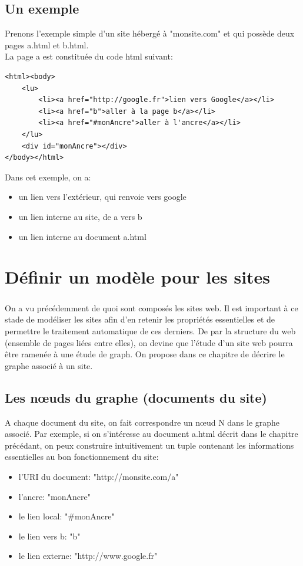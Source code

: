 \documentclass[a4paper]{report}
\begin{document}
\section*{Un exemple\\}
Prenons l'exemple simple d'un site hébergé à "monsite.com" et qui possède deux pages a.html et b.html.\\
La page a est constituée du code html suivant:\\
\begin{verbatim}
<html><body>
	<lu>
		<li><a href="http://google.fr">lien vers Google</a></li>
		<li><a href="b">aller à la page b</a></li>
		<li><a href="#monAncre">aller à l'ancre</a></li>
	</lu>
	<div id="monAncre"></div>
</body></html>
\end{verbatim}
Dans cet exemple, on a:
\begin{itemize}
\item un lien vers l’extérieur, qui renvoie vers google
\item un lien interne au site, de a vers b
\item un lien interne au document a.html
\end{itemize}

\chapter*{Définir un modèle pour les sites}

\paragraph*{}
On a vu précédemment de quoi sont composés les sites web. Il est important à ce stade de modéliser les sites afin d'en retenir les propriétés essentielles et de permettre le traitement automatique de ces derniers. De par la structure du web (ensemble de pages liées entre elles), on devine que l'étude d'un site web pourra être ramenée à une étude de graph. On propose dans ce chapitre de décrire le graphe associé à un site.

\section*{ Les nœuds du graphe (documents du site)\\ }
A chaque document du site, on fait correspondre un nœud N dans le graphe associé.
Par exemple, si on s'intéresse au document a.html décrit dans le chapitre précédant, on peux construire intuitivement un tuple contenant les informations essentielles au bon fonctionnement du site:
\begin{itemize}
\item l'URI du document: "http://monsite.com/a"
\item l'ancre: "monAncre"
\item le lien local: "$\#$monAncre"
\item le lien vers b: "b"
\item le lien externe: "http://www.google.fr"\\
\end{itemize}
\end{document}
